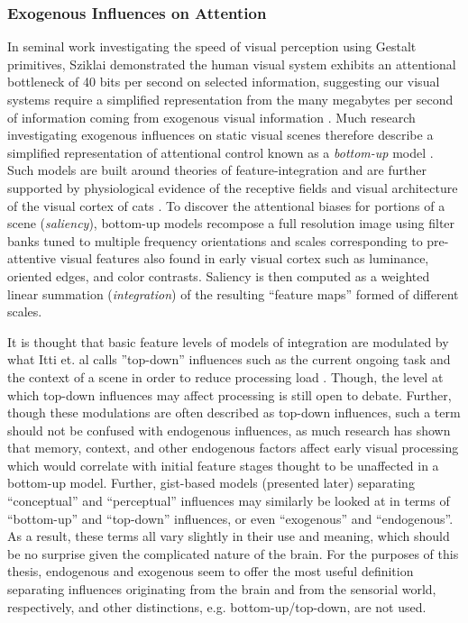 \documentclass[a4paper,10pt,final]{ThesisStyle}
\begin{document}
\subsubsection{Exogenous Influences on Attention}

In seminal work investigating the speed of visual perception using Gestalt primitives, Sziklai demonstrated the human visual system exhibits an attentional bottleneck of 40 bits per second on selected information, suggesting our visual systems require a simplified representation from the many megabytes per second of information coming from exogenous visual information \cite{Sziklai1956,Merrill1968}.  Much research investigating exogenous influences on static visual scenes therefore describe a simplified representation of attentional control known as a \textit{bottom-up} model \cite{Koch1985,Itti1998,Wolfe1989,Itti2001}.  Such models are built around theories of feature-integration \cite{Treisman1980} and are further supported by physiological evidence of the receptive fields and visual architecture of the visual cortex of cats \cite{Hubel1962}.  To discover the attentional biases for portions of a scene (\textit{saliency}), bottom-up models recompose a full resolution image using filter banks tuned to multiple frequency orientations and scales corresponding to pre-attentive visual features also found in early visual cortex such as luminance, oriented edges, and color contrasts.  Saliency is then computed as a weighted linear summation (\textit{integration}) of the resulting ``feature maps'' formed of different scales. 

It is thought that basic feature levels of models of integration are modulated by what Itti et. al calls ''top-down'' influences \cite{Itti2001} such as the current ongoing task \cite{Yarbus1967,Smith2011a} and the context of a scene in order to reduce processing load \cite{Henderson2003,Torralba2006}.  Though, the level at which top-down influences may affect processing is still open to debate.  Further, though these modulations are often described as top-down influences, such a term should not be confused with endogenous influences, as much research has shown that memory, context, and other endogenous factors affect early visual processing \cite{Tatler2011} which would correlate with initial feature stages thought to be unaffected in a bottom-up model.  Further, gist-based models (presented later) separating ``conceptual'' and ``perceptual'' influences may similarly be looked at in terms of ``bottom-up'' and ``top-down'' influences, or even ``exogenous'' and ``endogenous''.  As a result, these terms all vary slightly in their use and meaning, which should be no surprise given the complicated nature of the brain.  For the purposes of this thesis, endogenous and exogenous seem to offer the most useful definition separating influences originating from the brain and from the sensorial world, respectively, and other distinctions, e.g. bottom-up/top-down, are not used. 
\end{document}

